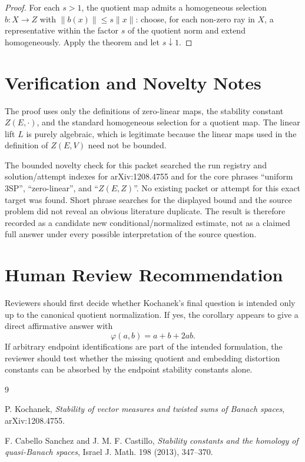 \documentclass[11pt]{article}
\begin{document}
\begin{proof}
For each $s>1$, the quotient map admits a homogeneous selection
$b:X\to Z$ with $\|b(x)\|\leq s\|x\|$: choose, for each non-zero ray in $X$,
a representative within the factor $s$ of the quotient norm and extend
homogeneously.  Apply the theorem and let $s\downarrow 1$.
\end{proof}

\section*{Verification and Novelty Notes}

The proof uses only the definitions of zero-linear maps, the stability
constant $Z(E,\cdot)$, and the standard homogeneous selection for a quotient
map. The linear lift $L$ is purely algebraic, which is legitimate because the
linear maps used in the definition of $Z(E,V)$ need not be bounded.

The bounded novelty check for this packet searched the run registry and
solution/attempt indexes for arXiv:1208.4755 and for the core phrases
``uniform 3SP'', ``zero-linear'', and ``$Z(E,Z)$''.  No existing packet or
attempt for this exact target was found.  Short phrase searches for the
displayed bound and the source problem did not reveal an obvious literature
duplicate.  The result is therefore recorded as a candidate new
conditional/normalized estimate, not as a claimed full answer under every
possible interpretation of the source question.

\section*{Human Review Recommendation}

Reviewers should first decide whether Kochanek's final question is intended
only up to the canonical quotient normalization.  If yes, the corollary appears
to give a direct affirmative answer with
\[
\varphi(a,b)=a+b+2ab.
\]
If arbitrary endpoint identifications are part of the intended formulation,
the reviewer should test whether the missing quotient and embedding distortion
constants can be absorbed by the endpoint stability constants alone.

\begin{thebibliography}{9}

P. Kochanek,
\emph{Stability of vector measures and twisted sums of Banach spaces},
arXiv:1208.4755.

F. Cabello Sanchez and J. M. F. Castillo,
\emph{Stability constants and the homology of quasi-Banach spaces},
Israel J. Math. 198 (2013), 347--370.

\end{thebibliography}
\end{document}
